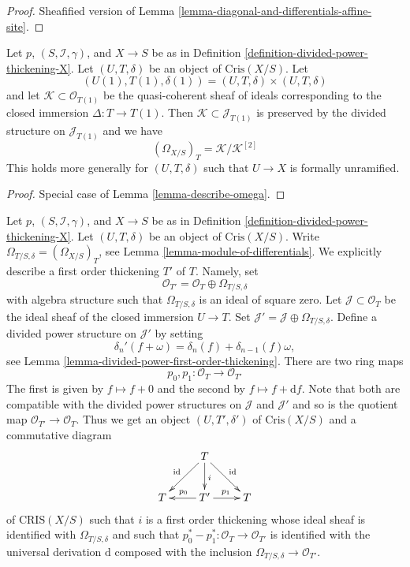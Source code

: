 \begin{proof}
Sheafified version of Lemma \ref{lemma-diagonal-and-differentials-affine-site}.
\end{proof}

\begin{lemma}
\label{lemma-describe-omega-small}
Let $p$, $(S, \mathcal{I}, \gamma)$, and $X \to S$ be as in
Definition \ref{definition-divided-power-thickening-X}.
Let $(U, T, \delta)$ be an object of $\text{Cris}(X/S)$.
Let
$$
(U(1), T(1), \delta(1)) = (U, T, \delta) \times (U, T, \delta)
$$
and let $\mathcal{K} \subset \mathcal{O}_{T(1)}$ be the quasi-coherent
sheaf of ideals corresponding to the closed immersion $\Delta : T \to T(1)$.
Then $\mathcal{K} \subset \mathcal{J}_{T(1)}$ is preserved by the
divided structure on $\mathcal{J}_{T(1)}$ and we have
$$
(\Omega_{X/S})_T = \mathcal{K}/\mathcal{K}^{[2]}
$$
This holds more generally for $(U, T, \delta)$ such that $U \to X$
is formally unramified.
\end{lemma}

\begin{proof}
Special case of Lemma \ref{lemma-describe-omega}.
\end{proof}

\begin{remark}
\label{remark-first-order-thickening}
Let $p$, $(S, \mathcal{I}, \gamma)$, and $X \to S$ be as in
Definition \ref{definition-divided-power-thickening-X}.
Let $(U, T, \delta)$ be an object of $\text{Cris}(X/S)$.
Write $\Omega_{T/S, \delta} = (\Omega_{X/S})_T$, see
Lemma \ref{lemma-module-of-differentials}.
We explicitly describe a first order thickening $T'$ of
$T$. Namely, set
$$
\mathcal{O}_{T'} = \mathcal{O}_T \oplus \Omega_{T/S, \delta}
$$
with algebra structure such that $\Omega_{T/S, \delta}$ is an
ideal of square zero. Let $\mathcal{J} \subset \mathcal{O}_T$
be the ideal sheaf of the closed immersion $U \to T$. Set
$\mathcal{J}' = \mathcal{J} \oplus \Omega_{T/S, \delta}$.
Define a divided power structure on $\mathcal{J}'$ by setting
$$
\delta_n'(f + \omega) = \delta_n(f) + \delta_{n - 1}(f)\omega,
$$
see Lemma \ref{lemma-divided-power-first-order-thickening}.
There are two ring maps
$$
p_0, p_1 : \mathcal{O}_T \to \mathcal{O}_{T'}
$$
The first is given by $f \mapsto f + 0$ and the second by
$f \mapsto f + \text{d}f$. Note that both are compatible with the
divided power structures on $\mathcal{J}$ and $\mathcal{J}'$
and so is the quotient map $\mathcal{O}_{T'} \to \mathcal{O}_T$.
Thus we get an object $(U, T', \delta')$ of $\text{Cris}(X/S)$
and a commutative diagram
$$
\xymatrix{
& T \ar[ld]_{\text{id}} \ar[d]^i \ar[rd]^{\text{id}} \\
T & T' \ar[l]_{p_0} \ar[r]^{p_1} & T
}
$$
of $\text{CRIS}(X/S)$ such that $i$ is a first order thickening whose ideal
sheaf is identified with $\Omega_{T/S, \delta}$ and such that
$p_0^* - p_1^* : \mathcal{O}_T \to \mathcal{O}_{T'}$
is identified with the universal derivation $\text{d}$
composed with the inclusion $\Omega_{T/S, \delta} \to \mathcal{O}_{T'}$.
\end{remark}

